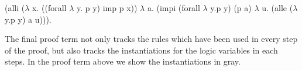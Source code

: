 \documentclass{llncs}
\newcommand{\mygray}[1]{{\color{green}#1}}
\newcommand{\figfoot}{\vspace{1ex}\hrule}
\newcommand{\fighead}{\hrule\vspace{1.5ex}}
\newcommand{\vd}{\vdash}
\newcommand{\arrow}{\rightarrow}
\newcommand{\oftp}{\mathord{:}}
\begin{document}
\begin{code}
(alli {\mygray{($\lambda\!\!$ x. ((forall $\lambda\!\!$ y. p y) imp p x))}}
   $\lambda\!\!$ a. (impi {\mygray{(forall $\lambda\!\!$ y.p y) (p a)}}
           $\lambda\!\!$ u. (alle {\mygray{($\lambda\!\!$ y.p y)}} a u))).
\end{code}

The final proof term not only tracks the rules which have been used in
every step of the proof, but also tracks the instantiations for the logic
variables in each steps. In the proof term above we show the
instantiations in gray.





\end{document}
